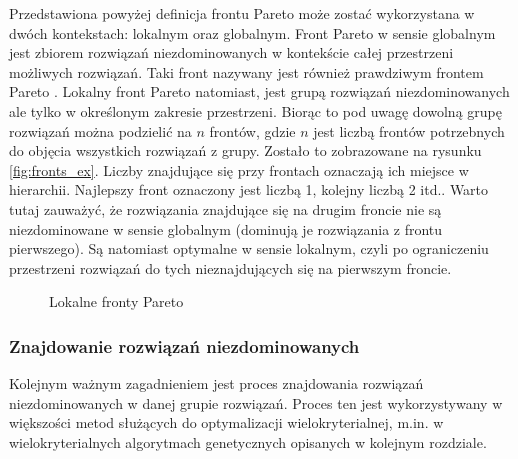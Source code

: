 \documentclass[twoside]{iisthesis}
\begin{document}
Przedstawiona powyżej definicja frontu Pareto może zostać wykorzystana w dwóch kontekstach: lokalnym oraz globalnym. Front Pareto w sensie globalnym jest zbiorem rozwiązań niezdominowanych w kontekście całej przestrzeni możliwych rozwiązań. Taki front nazywany jest również prawdziwym frontem Pareto \cite{book}. Lokalny front Pareto natomiast, jest grupą rozwiązań niezdominowanych ale tylko w określonym zakresie przestrzeni. Biorąc to pod uwagę dowolną grupę rozwiązań można podzielić na $n$ frontów, gdzie $n$ jest liczbą frontów potrzebnych do objęcia wszystkich rozwiązań z grupy. Zostało to zobrazowane na rysunku \eqref{fig:fronts_ex}. Liczby znajdujące się przy frontach oznaczają ich miejsce w hierarchii. Najlepszy front oznaczony jest liczbą 1, kolejny liczbą 2 itd.. Warto tutaj zauważyć, że rozwiązania znajdujące się na drugim froncie nie są niezdominowane w sensie globalnym (dominują je rozwiązania z frontu pierwszego). Są natomiast optymalne w sensie lokalnym, czyli po ograniczeniu przestrzeni rozwiązań do tych nieznajdujących się na pierwszym froncie.
\begin{figure}[!htb]
	\centering
	\caption{Lokalne fronty Pareto}
	\label{fig:fronts_ex}
\end{figure}
\subsubsection{Znajdowanie rozwiązań niezdominowanych}
Kolejnym ważnym zagadnieniem jest proces znajdowania rozwiązań niezdominowanych w danej grupie rozwiązań\cite{book}. Proces ten jest wykorzystywany w większości metod służących do optymalizacji wielokryterialnej, m.in. w wielokryterialnych algorytmach genetycznych opisanych w kolejnym rozdziale.
\end{document}
